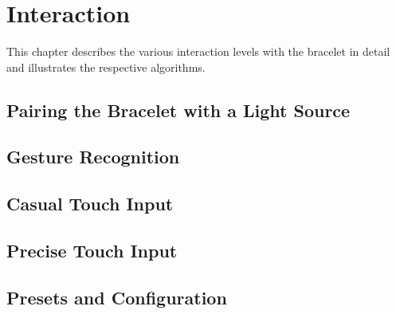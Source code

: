 \chapter{Interaction}

This chapter describes the various interaction levels with the bracelet in detail and illustrates the respective algorithms.

\section{Pairing the Bracelet with a Light Source}

\section{Gesture Recognition}


\section{Casual Touch Input}

\section{Precise Touch Input}

\section{Presets and Configuration}
